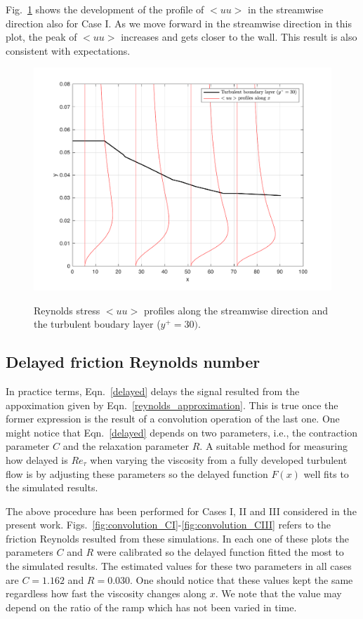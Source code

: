 \documentclass[twocolumn,10pt]{asme2e}
\begin{document}
Fig.~\ref{fig:uu_CI} shows the development of the profile of \(<uu>\) in the streamwise direction also for Case I. As we move forward in the streamwise direction in this plot, the peak of \(<uu>\) increases and gets closer to the wall. This result is also consistent with expectations.

\begin{figure}[t]
\centering
\scalebox{0.5}
{\includegraphics{uu_CI.pdf}}
\caption{Reynolds stress \(<uu>\) profiles along the streamwise direction and the turbulent boudary layer (\(y^+=30)\).}
\label{fig:uu_CI}
\end{figure}

\subsection*{Delayed friction Reynolds number}

In practice terms, Eqn.~\ref{delayed} delays the signal resulted from the appoximation given by Eqn.~\ref{reynolds_approximation}. This is true once the former expression is the result of a convolution operation of the last one. One might notice that Eqn.~\ref{delayed} depends on two parameters, i.e., the contraction parameter \(C\) and the relaxation parameter \(R\). A suitable method for measuring how delayed is \(Re_{\tau}\) when varying the viscosity from a fully developed turbulent flow is by adjusting these parameters so the delayed function \(F(x)\) well fits to the simulated results.

The above procedure has been performed for Cases I, II and III considered in the present work. Figs.~\ref{fig:convolution_CI}-\ref{fig:convolution_CIII} refers to the friction Reynolds resulted from these simulations. In each one of these plots the parameters \(C\) and \(R\) were calibrated so the delayed function fitted the most to the simulated results. The estimated values for these two parameters in all cases are \(C=1.162\) and \(R=0.030\). One should notice that these values kept the same regardless how fast the viscosity changes along \(x\). We note that the value may depend on the ratio of the ramp which has not been varied in time.
\end{document}
